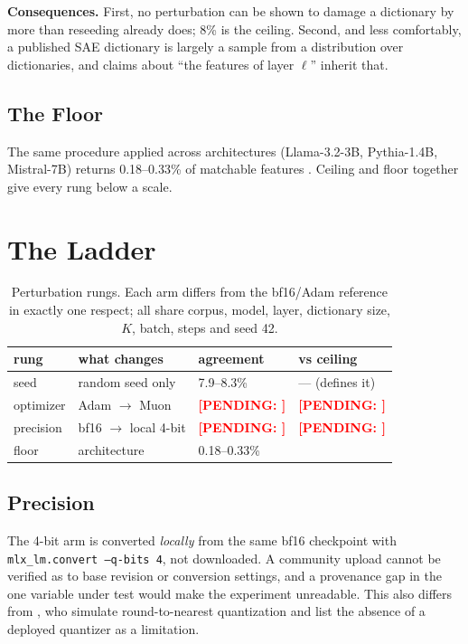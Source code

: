 \documentclass[11pt,a4paper]{article}
\newcounter{pendingcount}
\DeclareRobustCommand{\pending}[1]{\stepcounter{pendingcount}%
  \textcolor{red}{\textbf{[PENDING: #1]}}}
\begin{document}
\textbf{Consequences.} First, no perturbation can be shown to damage a dictionary by
more than reseeding already does; 8\% is the ceiling. Second, and less comfortably, a
published SAE dictionary is largely a sample from a distribution over dictionaries, and
claims about ``the features of layer $\ell$'' inherit that.

\subsection{The Floor}

The same procedure applied across architectures (Llama-3.2-3B, Pythia-1.4B,
Mistral-7B) returns 0.18--0.33\% of matchable features
\citep{melton2026sae}. Ceiling and floor together give every rung below a scale.

\section{The Ladder}
\label{sec:ladder}

\begin{table}[H]
  \centering
  \caption{Perturbation rungs. Each arm differs from the bf16/Adam reference in exactly
    one respect; all share corpus, model, layer, dictionary size, $K$, batch, steps and
    seed 42.}
  \label{tab:rungs}
  \smallskip
  \begin{tabular}{llll}
    \toprule
    rung & what changes & agreement & vs ceiling \\
    \midrule
    seed      & random seed only        & 7.9--8.3\% & --- (defines it) \\
    optimizer & Adam $\to$ Muon         & \pending{} & \pending{} \\
    precision & bf16 $\to$ local 4-bit  & \pending{} & \pending{} \\
    \midrule
    floor     & architecture            & 0.18--0.33\% & \\
    \bottomrule
  \end{tabular}
\end{table}

\subsection{Precision}

The 4-bit arm is converted \emph{locally} from the same bf16 checkpoint with
\texttt{mlx\_lm.convert --q-bits 4}, not downloaded. A community upload cannot be
verified as to base revision or conversion settings, and a provenance gap in the one
variable under test would make the experiment unreadable. This also differs from
\citet{duan2026quant}, who simulate round-to-nearest quantization and list the absence
of a deployed quantizer as a limitation.
\end{document}
